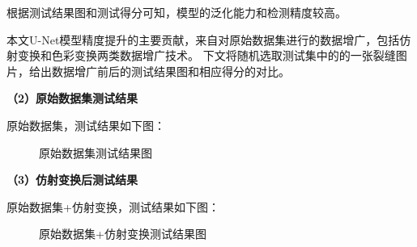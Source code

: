 根据测试结果图和测试得分可知，模型的泛化能力和检测精度较高。

本文U-Net模型精度提升的主要贡献，来自对原始数据集进行的数据增广，包括仿射变换和色彩变换两类数据增广技术。
下文将随机选取测试集中的的一张裂缝图片，给出数据增广前后的测试结果图和相应得分的对比。

\textbf{（2）原始数据集测试结果}

原始数据集，测试结果如下图：
\begin{figure}[H]
    \caption{原始数据集测试结果图}
    \label{test-origin}
\end{figure}

\textbf{（3）仿射变换后测试结果}

原始数据集+仿射变换，测试结果如下图：
\begin{figure}[H]
    \caption{原始数据集+仿射变换测试结果图}
    \label{test-geometry}
\end{figure}

